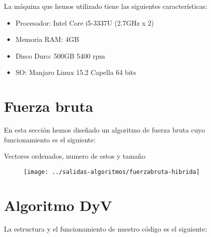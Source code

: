 La máquina que hemos utilizado tiene las siguientes características:
	
\begin{itemize}
		
	\item Procesador: Intel Core i5-3337U (2.7GHz x 2)
	\item Memoria RAM: 4GB
	\item Disco Duro: 500GB 5400 rpm
	\item SO: Manjaro Linux 15.2 Capella 64 bits
\end{itemize}
	



\section{Fuerza bruta} %

En esta sección hemos diseñado un algoritmo de fuerza bruta cuyo funcionamiento es el siguiente:

	\begin{algorithmic}
		\Require Vectores ordenados, numero de estos y tamaño
		
		\EndFor
	\end{algorithmic}


	\begin{figure}[H]
\centering
\texttt{[image: ../salidas-algoritmos/fuerzabruta-hibrida]}
\caption{}
\label{fig:fuerzabruta-hibrida}
\end{figure}



\section{Algoritmo DyV} %
 La estructura y el funcionamiento de nuestro código es el siguiente:
 
